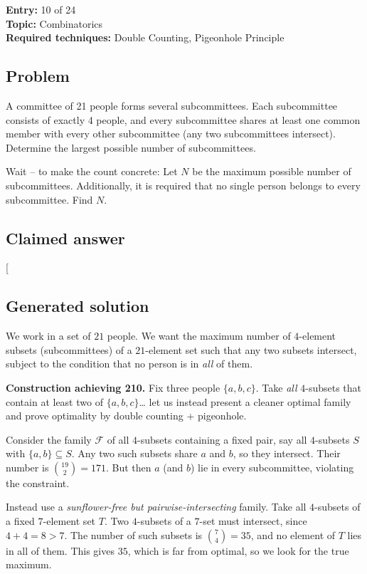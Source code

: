 \documentclass[
  11pt,
  letterpaper,
]{article}
\begin{document}
\textbf{Entry:} 10 of 24\\
\textbf{Topic:} Combinatorics\\
\textbf{Required techniques:} Double Counting, Pigeonhole Principle

\subsection{Problem}\label{problem-9}

A committee of 21 people forms several subcommittees. Each subcommittee
consists of exactly 4 people, and every subcommittee shares at least one
common member with every other subcommittee (any two subcommittees
intersect). Determine the largest possible number of subcommittees.

Wait -- to make the count concrete: Let \(N\) be the maximum possible
number of subcommittees. Additionally, it is required that no single
person belongs to every subcommittee. Find \(N\).

\subsection{Claimed answer}\label{claimed-answer-9}

{[}\boxed{210}{]}

\subsection{Generated solution}\label{generated-solution-9}

We work in a set of \(21\) people. We want the maximum number of
\(4\)-element subsets (subcommittees) of a \(21\)-element set such that
any two subsets intersect, subject to the condition that no person is in
\emph{all} of them.

\textbf{Construction achieving 210.} Fix three people \(\{a,b,c\}\).
Take \emph{all} \(4\)-subsets that contain at least two of
\(\{a,b,c\}\)\ldots{} let us instead present a cleaner optimal family
and prove optimality by double counting + pigeonhole.

Consider the family \(\mathcal{F}\) of all \(4\)-subsets containing a
fixed pair, say all \(4\)-subsets \(S\) with \(\{a,b\}\subseteq S\). Any
two such subsets share \(a\) and \(b\), so they intersect. Their number
is \(\binom{19}{2}=171\). But then \(a\) (and \(b\)) lie in every
subcommittee, violating the constraint.

Instead use a \emph{sunflower-free but pairwise-intersecting} family.
Take all \(4\)-subsets of a fixed \(7\)-element set \(T\). Two
\(4\)-subsets of a \(7\)-set must intersect, since \(4+4=8>7\). The
number of such subsets is \(\binom{7}{4}=35\), and no element of \(T\)
lies in all of them. This gives \(35\), which is far from optimal, so we
look for the true maximum.
\end{document}
